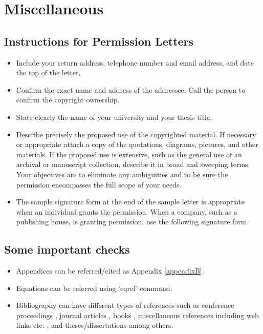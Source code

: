 

\chapter{Miscellaneous}
\label{chapter4}

\section{Instructions for Permission Letters}

\begin{itemize}
\item Include your return address, telephone number and email address, and date the top of the letter. 
\item	Confirm the exact name and address of the addressee. Call the person to confirm the copyright ownership.
\item	State clearly the name of your university and your thesis title. 
\item	Describe precisely the proposed use of the copyrighted material. If necessary or appropriate attach a copy of the quotations, diagrams, pictures, and other materials. If the proposed use is extensive, such as the general use of an archival or manuscript collection, describe it in broad and sweeping terms. Your objectives are to eliminate any ambiguities and to be sure the permission encompasses the full scope of your needs. 
\item	The sample signature form at the end of the sample letter is appropriate when an individual grants the permission. When a company, such as a publishing house, is granting permission, use the following signature form.

\end{itemize}

\section{Some important checks}

\begin{itemize}
\item Appendices can be referred/cited as Appendix \ref{appendixB}.
\item Equations can be referred using 'eqref' command.
\item Bibliography can have different types of references such as conference proceedings \cite{key1}, journal articles \cite{key2}, books \cite{key3}, miscellaneous references including web links etc. \cite{key4}, and theses/dissertations \cite{key5} among others.

\end{itemize}

